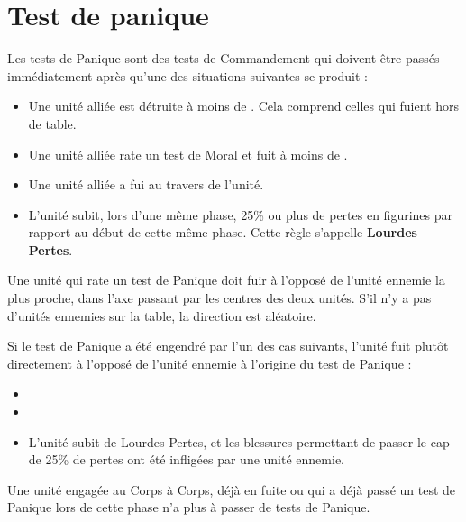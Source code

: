 \section{Test de panique}

Les tests de Panique sont des tests de Commandement qui doivent être passés immédiatement après qu'une des situations suivantes se produit :
\begin{itemize}[label={-}]
\item Une unité alliée est détruite à moins de . Cela comprend celles qui fuient hors de table.
\item Une unité alliée rate un test de Moral et fuit à moins de .
\item Une unité alliée a fui au travers de l'unité.
\item L'unité subit, lors d'une même phase, 25\% ou plus de pertes en figurines par rapport au début de cette même phase. Cette règle s'appelle \textbf{Lourdes Pertes}.
\end{itemize}

Une unité qui rate un test de Panique doit fuir à l'opposé de l'unité ennemie la plus proche, dans l'axe passant par les centres des deux unités. S'il n'y a pas d'unités ennemies sur la table, la direction est aléatoire.

Si le test de Panique a été engendré par l'un des cas suivants, l'unité fuit plutôt directement à l'opposé de l'unité ennemie à l'origine du test de Panique :
\begin{itemize}[label={-}]
\item {}
\item {}
\item L'unité subit de Lourdes Pertes, et les blessures permettant de passer le cap de 25\% de pertes ont été infligées par une unité ennemie.
\end{itemize}

Une unité engagée au Corps à Corps, déjà en fuite ou qui a déjà passé un test de Panique lors de cette phase n'a plus à passer de tests de Panique.
